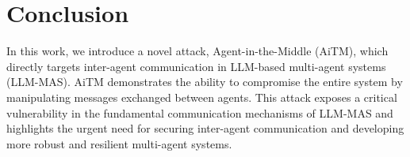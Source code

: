 




\section{Conclusion}
In this work, we introduce a novel attack, Agent-in-the-Middle (AiTM), which directly targets inter-agent communication in LLM-based multi-agent systems (LLM-MAS). AiTM demonstrates the ability to compromise the entire system by manipulating messages exchanged between agents. This attack exposes a critical vulnerability in the fundamental communication mechanisms of LLM-MAS and highlights the urgent need for securing inter-agent communication and developing more robust and resilient multi-agent systems.


